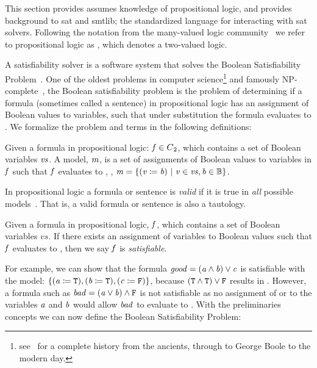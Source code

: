 \label{section:sat-solving}
%
This section provides assumes knowledge of propositional logic, and provides
background to \acl{sat} and \ac{smtlib}; the standardized language for
interacting with \ac{sat} solvers. Following the notation from the many-valued
logic community~\cite{Rescher1969-RESML} we refer to propositional logic as
\pl{}, which denotes a two-valued logic.

A satisfiability solver is a software system that solves the Boolean
Satisfiability Problem~\cite{russelNorvig}. One of the oldest problems in
computer science\footnote{see~\citet{BBH+09} for a complete history from the
  ancients, through to George Boole to the modern day.} and famously
NP-complete~\cite{10.1145/800157.805047}, the Boolean satisfiability problem is
the problem of determining if a formula (sometimes called a sentence) in
propositional logic has an assignment of Boolean values to variables, such that
under substitution the formula evaluates to \tru{}. We formalize the problem and
terms in the following definitions:

\begin{definition}[Model]
  Given a formula in propositional logic: $\mathit{f} \in {C\textsubscript{2}}{}$, which contains a
  set of Boolean variables $\mathit{vs}$. A model, $\mathit{m}$, is a set of assignments
  of Boolean values to variables in $\mathit{f}$ such that $\mathit{f}$ evaluates to
  \tru{}, \ie{}, $\mathit{m = \{ (v \coloneqq{} b)\ |\ v \in vs, b \in \mathbb{B}} \}$.
\end{definition}

\begin{corollary}[Validity]
  In propositional logic a formula or sentence is \emph{valid} if it is true in
  \emph{all} possible models~\cite{russelNorvig}. That is, a valid formula or
  sentence is also a tautology.
\end{corollary}

\begin{definition}[Satisfiable]
  Given a formula in propositional logic, $\mathit{f}$, which contains a set of
  Boolean variables $vs$. If there exists an assignment of variables to Boolean
  values such that $\mathit{f}$ evaluates to \tru{}, then we say $\mathit{f}$ is
  \emph{satisfiable}.
\end{definition}

For example, we can show that the formula $\mathit{good = (a \wedge b) \vee c}$ is
satisfiable with the model: $\{\mathit{(a \coloneqq{}{} \texttt{T}{}), (b \coloneqq{}{} \texttt{T}{}),
  (c \coloneqq{}{} \texttt{F}{})}\}$, because $(\texttt{T}{} \wedge{} \texttt{T}{}) \vee{} \texttt{F}{}$
results in \tru{}. However, a formula such as $\mathit{bad = (a \vee b) \wedge
  \texttt{F}{}}$ is not satisfiable as no assignment of \fls{} or \tru{} to the
variables $\mathit{a}$ and $\mathit{b}$ would allow $\mathit{bad}$ to evaluate to \tru{}.
With the preliminaries concepts we can now define the Boolean Satisfiability
Problem:

